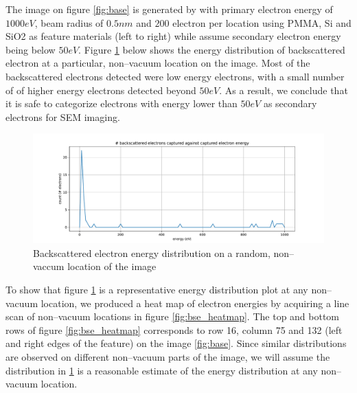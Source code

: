 The image on figure \ref{fig:base} is generated by with primary electron energy of $1000eV$, beam radius of $0.5nm$ and $200$ electron per location using PMMA, Si and SiO2 as feature materials (left to right) while assume secondary electron energy being below $50eV$. Figure \ref{fig:bse_energy} below shows the energy distribution of backscattered electron at a particular, non--vacuum location on the image. Most of the backscattered electrons detected were low energy electrons, with a small number of of higher energy electrons detected beyond $50eV$. As a result, we conclude that it is safe to categorize electrons with energy lower than $50eV$ as secondary electrons for SEM imaging.
\begin{figure}[h]
\begin{center}
\includegraphics[width=1.0\textwidth]{img/backscattered_energy.pdf}
\caption{\label{fig:bse_energy}Backscattered electron energy distribution on a random, non--vaccum location of the image}
\end{center}
\end{figure}

To show that figure \ref{fig:bse_energy} is a representative energy distribution plot at any non--vacuum location, we produced a heat map of electron energies by acquiring a line scan of non--vacuum locations in figure \ref{fig:bse_heatmap}. The top and bottom rows of figure \ref{fig:bse_heatmap} corresponds to row 16, column 75 and 132 (left and right edges of the feature) on the image \ref{fig:base}. Since similar distributions are observed on different non--vacuum parts of the image, we will assume the distribution in \ref{fig:bse_energy} is a reasonable estimate of the energy distribution at any non--vacuum location.


